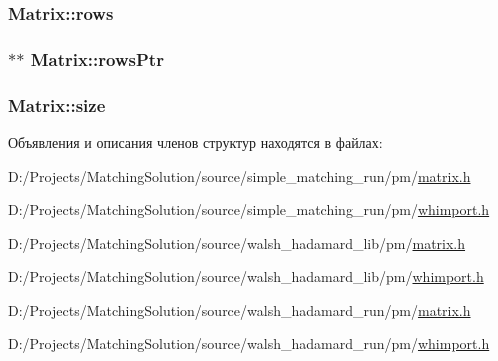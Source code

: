 \hypertarget{struct_matrix_19291f2c7f02b29d07db619d632e8724}{
\subsubsection[{rows}]{ {\bf Matrix::rows}}}
\label{struct_matrix_19291f2c7f02b29d07db619d632e8724}


\hypertarget{struct_matrix_910f11e896e007af62a3a72c3a15cf3d}{
\subsubsection[{rowsPtr}]{ $\ast$$\ast$ {\bf Matrix::rowsPtr}}}
\label{struct_matrix_910f11e896e007af62a3a72c3a15cf3d}


\hypertarget{struct_matrix_050f506f856b44a0deaf904489aa3afa}{
\subsubsection[{size}]{ {\bf Matrix::size}}}
\label{struct_matrix_050f506f856b44a0deaf904489aa3afa}




Объявления и описания членов структур находятся в файлах:\begin{CompactItemize}
\item 
D:/Projects/MatchingSolution/source/simple\_\-matching\_\-run/pm/\hyperlink{simple__matching__run_2pm_2matrix_8h}{matrix.h}\item 
D:/Projects/MatchingSolution/source/simple\_\-matching\_\-run/pm/\hyperlink{simple__matching__run_2pm_2whimport_8h}{whimport.h}\item 
D:/Projects/MatchingSolution/source/walsh\_\-hadamard\_\-lib/pm/\hyperlink{walsh__hadamard__lib_2pm_2matrix_8h}{matrix.h}\item 
D:/Projects/MatchingSolution/source/walsh\_\-hadamard\_\-lib/pm/\hyperlink{walsh__hadamard__lib_2pm_2whimport_8h}{whimport.h}\item 
D:/Projects/MatchingSolution/source/walsh\_\-hadamard\_\-run/pm/\hyperlink{walsh__hadamard__run_2pm_2matrix_8h}{matrix.h}\item 
D:/Projects/MatchingSolution/source/walsh\_\-hadamard\_\-run/pm/\hyperlink{walsh__hadamard__run_2pm_2whimport_8h}{whimport.h}\end{CompactItemize}
